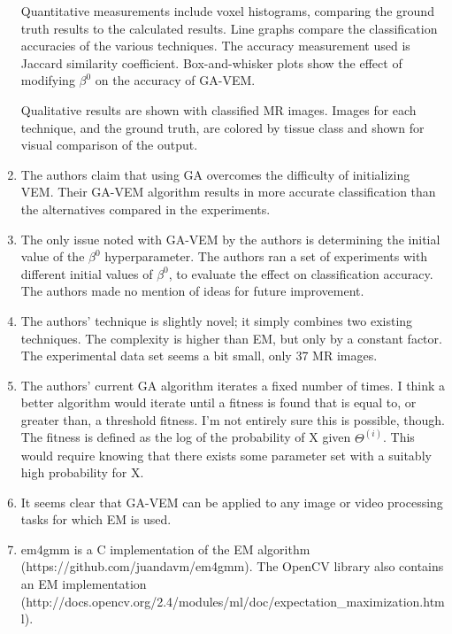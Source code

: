 \documentclass[11pt]{article}
\begin{document}
\begin{enumerate}
        Quantitative measurements include voxel histograms, comparing the ground
        truth results to the calculated results. Line graphs compare the
        classification accuracies of the various techniques. The accuracy
        measurement used is Jaccard similarity coefficient. Box-and-whisker
        plots show the effect of modifying \(\beta^0\) on the accuracy of
        GA-VEM.

        Qualitative results are shown with classified MR images. Images for each
        technique, and the ground truth, are colored by tissue class and shown
        for visual comparison of the output.

    \item The authors claim that using GA overcomes the difficulty of
        initializing VEM. Their GA-VEM algorithm results in more accurate
        classification than the alternatives compared in the experiments.

    \item The only issue noted with GA-VEM by the authors is determining the
        initial value of the \(\beta^0\) hyperparameter. The authors ran a set
        of experiments with different initial values of \(\beta^0\), to evaluate
        the effect on classification accuracy. The authors made no mention of
        ideas for future improvement.

    \item The authors' technique is slightly novel; it simply combines two
        existing techniques. The complexity is higher than EM, but only by a
        constant factor. The experimental data set seems a bit small, only 37 MR
        images.

    \item The authors' current GA algorithm iterates a fixed number of times. I
        think a better algorithm would iterate until a fitness is found that is
        equal to, or greater than, a threshold fitness. I'm not entirely sure
        this is possible, though. The fitness is defined as the log of the
        probability of X given \(\Theta^{(i)}\). This would require knowing that
        there exists some parameter set with a suitably high probability for X.

    \item It seems clear that GA-VEM can be applied to any image or video
        processing tasks for which EM is used.

    \item em4gmm is a C implementation of the EM algorithm \\
        (https://github.com/juandavm/em4gmm). The OpenCV library also contains
        an EM implementation \\
        (http://docs.opencv.org/2.4/modules/ml/doc/expectation\_maximization.html).
\end{enumerate}



\end{document}
